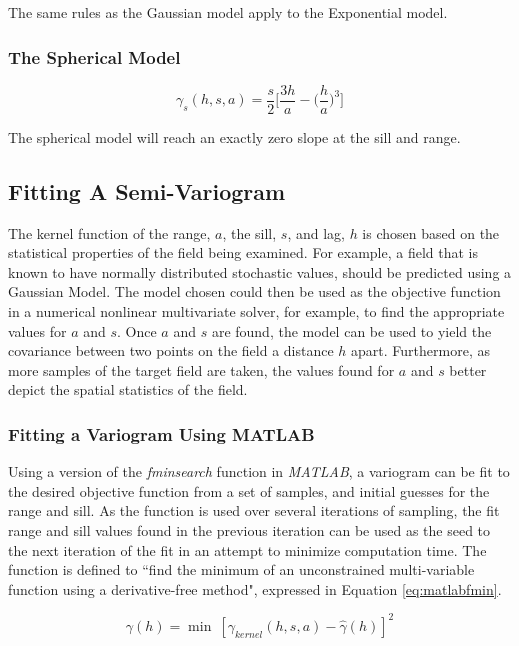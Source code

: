 The same rules as the Gaussian model apply to the Exponential model.

\subsubsection{The Spherical Model}

\begin{equation}
	\gamma_s(h, s, a) = \frac{s}{2} \Bigg[ \dfrac{3h}{a} - \Bigg( \dfrac{h}{a} \Bigg)^3 \Bigg]
	\label{eq:sph_model}
\end{equation}

The spherical model will reach an exactly zero slope at the sill and range.

\subsection{Fitting A Semi-Variogram} \label{sec:varfit}
The kernel function of the range, $a$, the sill, $s$, and lag, $h$ is chosen based on the statistical properties of the field being examined. For example, a field that is known to have normally distributed stochastic values, should be predicted using a Gaussian Model. The model chosen could then be used as the objective function in a numerical nonlinear multivariate solver, for example, to find the appropriate values for $a$ and $s$. Once $a$ and $s$ are found, the model can be used to yield the covariance between two points on the field a distance $h$ apart. Furthermore, as more samples of the target field are taken, the values found for $a$ and $s$ better depict the spatial statistics of the field.

\subsubsection{Fitting a Variogram Using MATLAB}
Using a version of the \textit{fminsearch} function in \textit{MATLAB}, a variogram can be fit to the desired objective function from a set of samples, and initial guesses for the range and sill. As the function is used over several iterations of sampling, the fit range and sill values found in the previous iteration can be used as the seed to the next iteration of the fit in an attempt to minimize computation time. The function is defined to ``find the minimum of an unconstrained multi-variable function using a derivative-free method", expressed in Equation \ref{eq:matlabfmin}.

\begin{equation}
\gamma(h) = \min\ [\gamma_{kernel}(h,s,a) - \hat{\gamma}(h)]^2
\label{eq:matlabfmin}
\end{equation}

